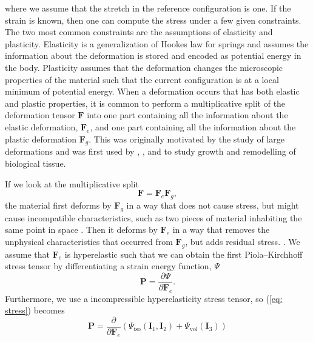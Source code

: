 where we assume that the stretch in the reference configuration is one. If the strain is known, then one can compute the stress under a few given constraints. The two most common constraints are the assumptions of elasticity and plasticity. Elasticity is a generalization of Hookes law for springs and assumes the information about the deformation is stored and encoded as potential energy in the body. Plasticity assumes that the deformation changes the microscopic properties of the material such that the current configuration is at a local minimum of potential energy. When a deformation occurs that has both elastic and plastic properties, it is common to perform a multiplicative split of the deformation tensor $\mathbf{F}$ into one part containing all the information about the elastic deformation, $\mathbf{F}_e$, and one part containing all the information about the plastic deformation $\mathbf{F}_g$. This was originally motivated by the study of large deformations and was first used by \citep{Kondaurov1987}, \citep{Takamizawa1990}, and \citep{Rodriguez1994} to study growth and remodelling of biological tissue. \par 
If we look at the multiplicative split
\begin{equation*}
    \mathbf{F} = \mathbf{F}_e\mathbf{F}_g,
\end{equation*}
the material first deforms by $\mathbf{F}_g$ in a way that does not cause stress, but might cause incompatible characteristics, such as two pieces of material inhabiting the same point in space . Then it deforms by $\mathbf{F}_e$ in a way that removes the unphysical characteristics that occurred from $\mathbf{F}_g$, but adds residual stress. . We assume that $\mathbf{F}_e$ is hyperelastic such that we can obtain the first Piola–Kirchhoff stress tensor by differentiating a strain energy function, $\Psi$
\begin{equation}
\label{eq: stress}
    \mathbf{P} = \frac{\partial\Psi}{\partial \mathbf{F}_e}.
\end{equation}
Furthermore, we use a  incompressible hyperelasticity stress tensor, so (\ref{eq: stress}) becomes
\begin{equation*}
    \mathbf{P} = \frac{\partial }{\partial \mathbf{F}_e}(\Psi_\text{iso}(\mathbf{I}_1, \mathbf{I}_2) + \Psi_\text{vol}(\mathbf{I}_3))
\end{equation*}
